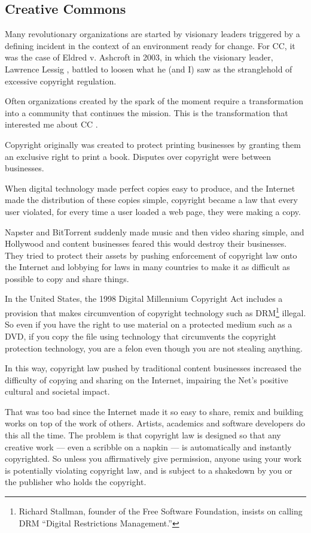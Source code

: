 \subsection{Creative Commons}
\label{sec:CC}

Many revolutionary organizations are started by visionary leaders triggered by a defining incident in the context of an environment ready for change. For \ac{CC}, it was the case of Eldred v. Ashcroft in 2003, in which the visionary leader, Lawrence Lessig \cite{lessig2005does}, battled to loosen what he (and I) saw as the stranglehold of excessive copyright regulation.

Often organizations created by the spark of the moment require a transformation into a community that continues the mission. This is the transformation that interested me about \ac{CC} .

Copyright originally was created to protect printing businesses by granting them an exclusive right to print a book. Disputes over copyright were between businesses.

When digital technology made perfect copies easy to produce, and the Internet made the distribution of these copies simple, copyright became a law that every user violated, for every time a user loaded a web page, they were making a copy.

Napster and BitTorrent suddenly made music and then video sharing simple, and Hollywood and content businesses feared this would destroy their businesses. They tried to protect their assets by pushing enforcement of copyright law onto the Internet and lobbying for laws in many countries to make it as difficult as possible to copy and share things.

In the United States, the 1998 Digital Millennium Copyright Act includes a provision that makes circumvention of copyright technology such as \ac{DRM}\footnote{Richard Stallman, founder of the Free Software Foundation, insists on calling DRM ``Digital Restrictions Management.''} illegal. So even if you have the right to use material on a protected medium such as a DVD, if you copy the file using technology that circumvents the copyright protection technology, you are a felon even though you are not stealing anything.

In this way, copyright law pushed by traditional content businesses increased the difficulty of copying and sharing on the Internet, impairing the Net's positive cultural and societal impact.

That was too bad since the Internet made it so easy to share, remix and building works on top of the work of others. Artists, academics and software developers do this all the time. The problem is that copyright law is designed so that any creative work --- even a scribble on a napkin --- is automatically and instantly copyrighted. So unless you affirmatively give permission, anyone using your work is potentially violating copyright law, and is subject to a shakedown by you or the publisher who holds the copyright.

